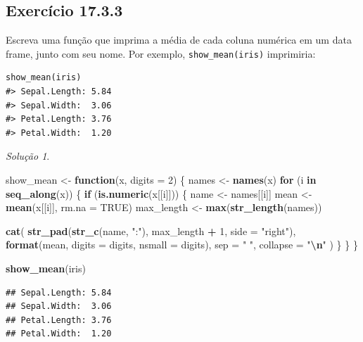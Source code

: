 \documentclass[
]{latex/krantz}
\newenvironment{Shaded}{\begin{snugshade}}{\end{snugshade}}
\newcommand{\AttributeTok}[1]{\textcolor[rgb]{0.13,0.29,0.53}{#1}}
\newcommand{\ConstantTok}[1]{\textcolor[rgb]{0.56,0.35,0.01}{#1}}
\newcommand{\ControlFlowTok}[1]{\textcolor[rgb]{0.13,0.29,0.53}{\textbf{#1}}}
\newcommand{\DecValTok}[1]{\textcolor[rgb]{0.00,0.00,0.81}{#1}}
\newcommand{\FunctionTok}[1]{\textcolor[rgb]{0.13,0.29,0.53}{\textbf{#1}}}
\newcommand{\NormalTok}[1]{#1}
\newcommand{\OtherTok}[1]{\textcolor[rgb]{0.56,0.35,0.01}{#1}}
\newcommand{\SpecialCharTok}[1]{\textcolor[rgb]{0.81,0.36,0.00}{\textbf{#1}}}
\newcommand{\StringTok}[1]{\textcolor[rgb]{0.31,0.60,0.02}{#1}}
\theoremstyle{definition}
\theoremstyle{definition}
\theoremstyle{definition}
\theoremstyle{definition}
\theoremstyle{remark}
\newtheorem*{solution}{Solução}
\begin{document}
\hypertarget{exr17-3-3}{%
\subsection*{Exercício 17.3.3}\label{exr17-3-3}}

Escreva uma função que imprima a média de cada coluna numérica em um data frame, junto com seu nome. Por exemplo, \texttt{show\_mean(iris)} imprimiria:

\begin{verbatim}
show_mean(iris)
#> Sepal.Length: 5.84
#> Sepal.Width:  3.06
#> Petal.Length: 3.76
#> Petal.Width:  1.20
\end{verbatim}

\begin{solution}
\leavevmode

\begin{Shaded}
\begin{Highlighting}[]
\NormalTok{show\_mean }\OtherTok{\textless{}{-}} \ControlFlowTok{function}\NormalTok{(x, }\AttributeTok{digits =} \DecValTok{2}\NormalTok{) \{}
\NormalTok{  names }\OtherTok{\textless{}{-}} \FunctionTok{names}\NormalTok{(x)}
  \ControlFlowTok{for}\NormalTok{ (i }\ControlFlowTok{in} \FunctionTok{seq\_along}\NormalTok{(x)) \{}
    \ControlFlowTok{if}\NormalTok{ (}\FunctionTok{is.numeric}\NormalTok{(x[[i]])) \{}
\NormalTok{      name }\OtherTok{\textless{}{-}}\NormalTok{ names[[i]]}
\NormalTok{      mean }\OtherTok{\textless{}{-}} \FunctionTok{mean}\NormalTok{(x[[i]], }\AttributeTok{rm.na =} \ConstantTok{TRUE}\NormalTok{)}
\NormalTok{      max\_length }\OtherTok{\textless{}{-}} \FunctionTok{max}\NormalTok{(}\FunctionTok{str\_length}\NormalTok{(names))}
      
      \FunctionTok{cat}\NormalTok{(}
        \FunctionTok{str\_pad}\NormalTok{(}\FunctionTok{str\_c}\NormalTok{(name, }\StringTok{":"}\NormalTok{), max\_length }\SpecialCharTok{+} \DecValTok{1}\NormalTok{, }\AttributeTok{side =} \StringTok{"right"}\NormalTok{),}
        \FunctionTok{format}\NormalTok{(mean, }\AttributeTok{digits =}\NormalTok{ digits, }\AttributeTok{nsmall =}\NormalTok{ digits),}
        \AttributeTok{sep =} \StringTok{" "}\NormalTok{,}
        \AttributeTok{collapse =} \StringTok{"}\SpecialCharTok{\textbackslash{}n}\StringTok{"}
\NormalTok{      )}
\NormalTok{    \}}
\NormalTok{  \}}
\NormalTok{\}}

\FunctionTok{show\_mean}\NormalTok{(iris)}
\end{Highlighting}
\end{Shaded}

\begin{verbatim}
## Sepal.Length: 5.84 
## Sepal.Width:  3.06 
## Petal.Length: 3.76 
## Petal.Width:  1.20
\end{verbatim}

\end{solution}
\end{document}
